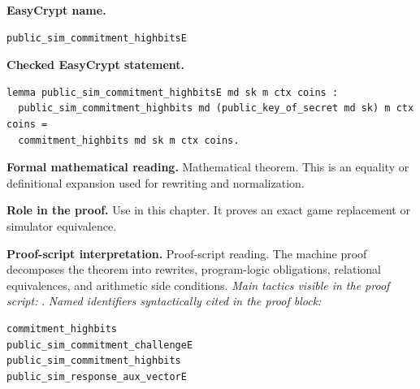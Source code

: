 \begin{formaltheorem}
\noindent\textbf{EasyCrypt name.}
\begin{lstlisting}[language=EasyCrypt,basicstyle=\ttfamily\scriptsize]
public_sim_commitment_highbitsE
\end{lstlisting}
\noindent\textbf{Checked EasyCrypt statement.}
\begin{lstlisting}[language=EasyCrypt,basicstyle=\ttfamily\scriptsize]
lemma public_sim_commitment_highbitsE md sk m ctx coins :
  public_sim_commitment_highbits md (public_key_of_secret md sk) m ctx coins =
  commitment_highbits md sk m ctx coins.
\end{lstlisting}
\noindent\textbf{Formal mathematical reading.}
Mathematical theorem. This is an equality or definitional expansion used for rewriting and normalization.

\noindent\textbf{Role in the proof.}
Use in this chapter. It proves an exact game replacement or simulator equivalence.

\noindent\textbf{Proof-script interpretation.}
Proof-script reading. The machine proof decomposes the theorem into rewrites, program-logic obligations, relational equivalences, and arithmetic side conditions.
\emph{Main tactics visible in the proof script:} .
\emph{Named identifiers syntactically cited in the proof block:}
\begin{lstlisting}[language=EasyCrypt,basicstyle=\ttfamily\scriptsize]
commitment_highbits
public_sim_commitment_challengeE
public_sim_commitment_highbits
public_sim_response_aux_vectorE
\end{lstlisting}

\end{formaltheorem}

